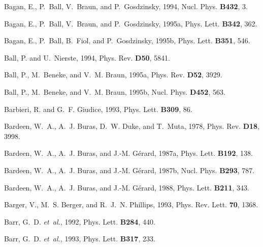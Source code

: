 \begin{thebibliography}{\protect{}1991}
Bagan, E., P.~Ball, V.~Braun, and P.~Gosdzinsky, 1994,
\newblock Nucl. Phys. {\bf B432}, 3.

Bagan, E., P.~Ball, V.~Braun, and P.~Gosdzinsky, 1995a,
\newblock Phys. Lett. {\bf B342}, 362.

Bagan, E., P.~Ball, B.~Fiol, and P.~Gosdzinsky, 1995b,
\newblock Phys. Lett. {\bf B351}, 546.

Ball, P. and U.~Nierste, 1994,
\newblock Phys. Rev. {\bf D50}, 5841.

Ball, P., M.~Beneke, and V.~M. Braun, 1995a,
\newblock Phys. Rev. {\bf D52}, 3929.

Ball, P., M.~Beneke, and V.~M. Braun, 1995b,
\newblock Nucl. Phys. {\bf D452}, 563.

Barbieri, R. and G.~F. Giudice, 1993,
\newblock Phys. Lett. {\bf B309}, 86.

Bardeen, W.~A., A.~J. Buras, D.~W. Duke, and T.~Muta, 1978,
\newblock Phys. Rev. {\bf D18}, 3998.

Bardeen, W.~A., A.~J. Buras, and J.-M. G\'{e}rard, 1987a,
\newblock Phys. Lett. {\bf B192}, 138.

Bardeen, W.~A., A.~J. Buras, and J.-M. G\'{e}rard, 1987b,
\newblock Nucl. Phys. {\bf B293}, 787.

Bardeen, W.~A., A.~J. Buras, and J.-M. G\'{e}rard, 1988,
\newblock Phys. Lett. {\bf B211}, 343.

Barger, V., M.~S. Berger, and R.~J.~N. Phillips, 1993,
\newblock Phys. Rev. Lett. {\bf 70}, 1368.

Barr, G.~D. {\em et~al.\/}, 1992,
\newblock Phys. Lett. {\bf B284}, 440.

Barr, G.~D. {\em et~al.\/}, 1993,
\newblock Phys. Lett. {\bf B317}, 233.


\end{thebibliography}
